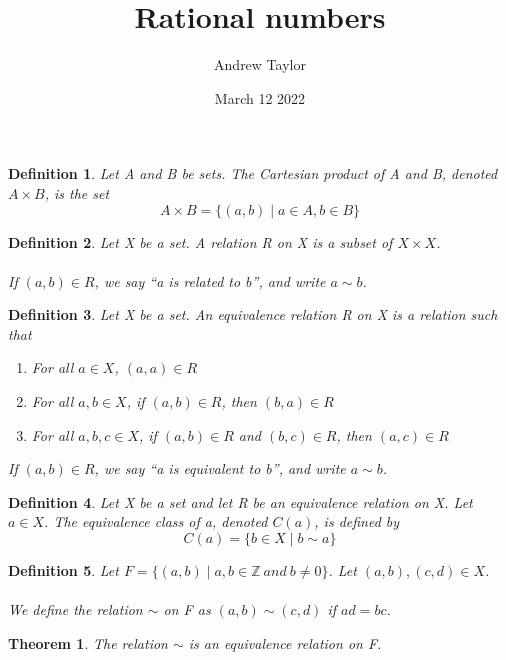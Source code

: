 \documentclass{article}
\title{Rational numbers}
\author{Andrew Taylor}
\date{March 12 2022}
\newtheorem{definition}{Definition}
\newtheorem{theorem}{Theorem}
\begin{document}
\maketitle
\begin{definition}
Let A and B be sets. The Cartesian product of A and B, denoted $A \times B$, is the set
\begin{equation*}
A \times B = \{(a, b) \mid a \in A, b \in B\}
\end{equation*}
\end{definition}
\begin{definition}
Let X be a set. A relation R on X is a subset of $X \times X$. 
\\
\\
If $(a, b) \in R$, we say ``a is related to b'', and write $a \sim b$.
\end{definition}
\begin{definition}
Let X be a set. An equivalence relation R on X is a relation such that
\begin{enumerate}
\item For all $a \in X$, $(a, a) \in R$
\item For all $a, b \in X$, if $(a, b) \in R$, then $(b, a) \in R$
\item For all $a, b, c \in X$, if $(a, b) \in R$ and $(b, c) \in R$, then $(a, c) \in R$
\end{enumerate}
If $(a, b) \in R$, we say ``a is equivalent to b'', and write $a \sim b$.
\end{definition}
\begin{definition}
Let X be a set and let R be an equivalence relation on X. Let $a \in X$. The equivalence class of a, denoted $C(a)$, is defined by 
\begin{equation*}
C(a) = \{b \in X \mid b \sim a\}
\end{equation*}
\end{definition}
\begin{definition}
Let $F = \{(a, b) \mid a, b \in \mathbb{Z}\  and \  b \ne 0\}$. Let $(a, b), (c, d) \in X$. 
\\
\\
We define the relation $\sim$ on F as $(a, b) \sim (c, d)$ if $ad = bc$. 
\end{definition}
\begin{theorem}
The relation $\sim$ is an equivalence relation on F.
\end{theorem}
\end{document}
